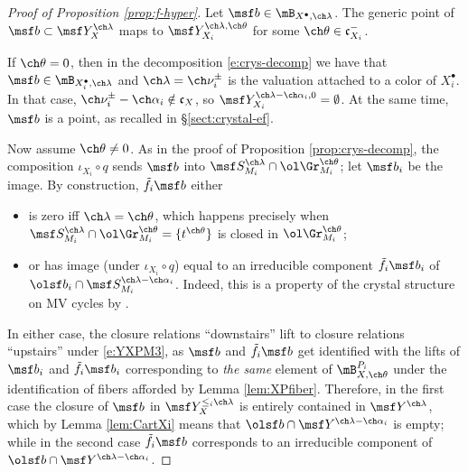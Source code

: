 \documentclass[final]{amsart}
\theoremstyle{remark}
\theoremstyle{definition}
\numberwithin{equation}{section}
\begin{document}
\begin{proof}[Proof of Proposition \ref{prop:f-hyper}]
Let $\msf b \in \mB_{X^\bullet, \ch\lambda}$.
The generic point of $\msf b \subset \msf Y^{\ch\lambda}_X$ maps to 
$\msf Y^{\ch\lambda,\ch\theta}_{X_i}$ 
for some $\ch\theta \in \mathfrak c_{X_i}^-$.

If $\ch\theta=0$, then in the decomposition \eqref{e:crys-decomp} we have that $\msf b\in \mB_{X_i^\bullet,\ch\lambda}$ and 
$\ch\lambda = \ch\nu_i^\pm$ is the valuation attached to a color of $X_i^\bullet$. In that case, $\ch\nu_i^\pm-\ch\alpha_i \notin \mathfrak c_X$,
so  $\msf Y^{\ch\lambda-\ch\alpha_i,0}_{X_i} = \emptyset$. At the same time, $\msf b$ is a point, as recalled in \S \ref{sect:crystal-ef}.

Now assume $\ch\theta \ne 0$. As in the proof of Proposition \ref{prop:crys-decomp}, the composition $\iota_{X_i}\circ q$  sends $\msf b$ into $\msf S_{M_i}^{\ch\lambda}\cap \ol\Gr_{M_i}^{\ch\theta}$; let $\msf b_i$ be the image. By construction, $\tilde f_i \msf b$ either 
\begin{itemize}
 \item is zero iff $\ch\lambda = \ch\theta$, which happens precisely when $\msf S_{M_i}^{\ch\lambda}\cap \ol\Gr_{M_i}^{\ch\theta} = \{t^{\ch\theta}\}$ is closed in $\ol\Gr_{M_i}^{\ch\theta}$;
 \item or has image (under $\iota_{X_i}\circ q$) equal to an irreducible component $\tilde f_i \msf b_i$ of $\olsf b_i \cap \msf S_{M_i}^{\ch\lambda-\ch\alpha_i}$. Indeed, this is a property of the crystal structure on MV cycles by \cite{BGcrys}.
\end{itemize}

In either case, the closure relations ``downstairs'' lift to closure relations ``upstairs'' under \eqref{e:YXPM3}, as $\msf b$ and $\tilde f_i\msf b$ get identified with the lifts of $\msf b_i$ and $\tilde f_i\msf b_i$ corresponding to \emph{the same} element of $\mB^{P_i}_{X,\ch\theta}$ under the identification of fibers afforded by Lemma \ref{lem:XPfiber}. Therefore, in the first case the closure of $\msf b$ in $\msf Y^{\le_i \ch\lambda}_{X}$ is entirely contained in $\msf Y^{\ch\lambda}$, which by Lemma \ref{lem:CartXi} means that $\olsf b \cap \msf Y^{\ch\lambda-\ch\alpha_i}$ is empty; while in the second case $\tilde f_i\msf b$ corresponds to an irreducible component of $\olsf b \cap \msf Y^{\ch\lambda-\ch\alpha_i}$. 
\end{proof}
\end{document}
